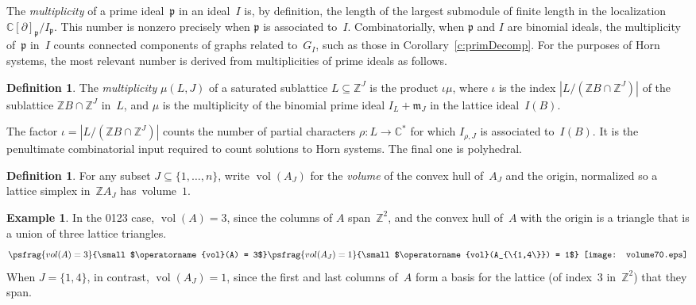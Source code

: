 \documentclass[12pt]{amsart}
\numberwithin{equation}{section}
\theoremstyle{definition}
\newtheorem{defn}[thm]{Definition}
\newtheorem{example}[thm]{Example}
\begin{document}
The \emph{multiplicity} of a prime ideal~${\mathfrak{p}}$ in an ideal~$I$ is, by
definition, the length of the largest submodule of finite length in
the localization ${\mathbb{C}}[{\partial}]_{\mathfrak{p}}/I_{\mathfrak{p}}$.  This number is nonzero
precisely when ${\mathfrak{p}}$ is associated to~$I$.  Combinatorially, when
${\mathfrak{p}}$ and $I$ are binomial ideals, the multiplicity of~${\mathfrak{p}}$ in~$I$
counts connected components of graphs related to~$G_I$, such as those
in Corollary~\ref{c:primDecomp}.  For the purposes of Horn systems,
the most relevant number is derived from multiplicities of prime
ideals as follows.

\begin{defn}
The \emph{multiplicity} $\mu(L,J)$ of a saturated sublattice $L
\subseteq {\mathbb{Z}}^J$ is the product $\iota\mu$, where $\iota$ is the index
$|L/({\mathbb{Z}} B\cap{\mathbb{Z}}^J)|$ of the sublattice ${\mathbb{Z}} B \cap {\mathbb{Z}}^J$ in~$L$,
and $\mu$ is the multiplicity of the binomial prime ideal $I_L +
{\mathfrak{m}}_J$ in the lattice ideal~$I(B)$.
\end{defn}

The factor $\iota = |L/({\mathbb{Z}} B\cap{\mathbb{Z}}^J)|$ counts the number of partial
characters $\rho : L \to {\mathbb{C}}^*$ for which $I_{\rho,J}$ is associated
to~$I(B)$.  It is the penultimate combinatorial input required to
count solutions to Horn systems.  The final one is polyhedral.

\begin{defn}
For any subset $J \subseteq \{1,\ldots,n\}$, write $\operatorname{vol}(A_J)$ for the
\emph{volume} of the convex hull of~$A_J$ and the origin, normalized
so a lattice simplex in~${\mathbb{Z}} A_J$ has~volume~$1$.
\end{defn}

\begin{example}\label{e:vol}
In the 0123 case, $\operatorname{vol}(A) = 3$, since the columns of $A$
span~${\mathbb{Z}}^2$, and the convex hull of~$A$ with the origin is a triangle
that is a union of three lattice triangles.
$$\psfrag{vol(A) = 3}{\small$\operatorname{vol}(A) = 3$}
\psfrag{vol(A_J) = 1}{\small$\operatorname{vol}(A_{\{1,4\}}) = 1$}
\begin{array}{c@{}}\\[-2.8ex]\texttt{[image: volume70.eps]}\end{array}
$$
When $J = \{1,4\}$, in contrast, $\operatorname{vol}(A_J) = 1$, since the first and
last columns of~$A$ form a basis for the lattice (of index~$3$
in~${\mathbb{Z}}^2$) that they span.
\end{example}
\end{document}
